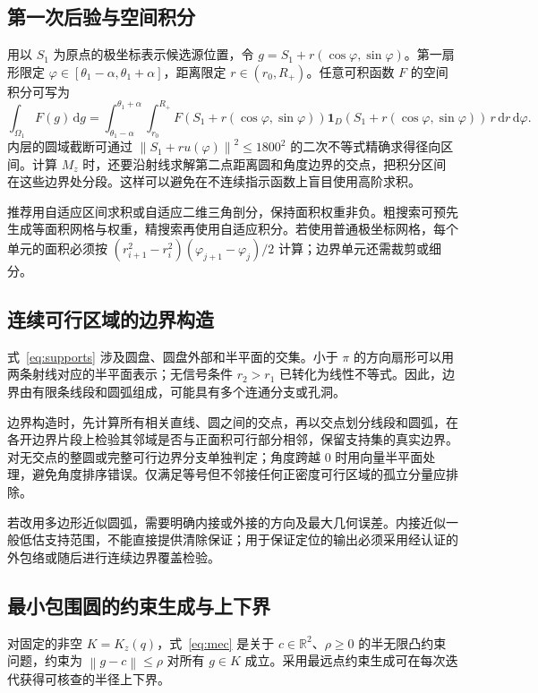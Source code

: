 \documentclass[UTF8,a4paper,zihao=-4,fontset=none]{ctexart}
\numberwithin{equation}{section}
\theoremstyle{definition}
\newcommand{\R}{\mathbb R}
\newcommand{\ind}{\mathbf 1}
\newcommand{\dd}{\,\mathrm d}
\newcommand{\norm}[1]{\left\lVert #1\right\rVert}
\begin{document}
\subsection{第一次后验与空间积分}
用以 \(S_1\) 为原点的极坐标表示候选源位置，令 \(g=S_1+r(\cos\varphi,\sin\varphi)\)。第一扇形限定 \(\varphi\in[\theta_1-\alpha,\theta_1+\alpha]\)，距离限定 \(r\in(r_0,R_+)\)。任意可积函数 \(F\) 的空间积分可写为
\begin{equation}\label{eq:polar}
\int_{\Omega_1}F(g)\dd g
=\int_{\theta_1-\alpha}^{\theta_1+\alpha}
\int_{r_0}^{R_+}
F\!\left(S_1+r(\cos\varphi,\sin\varphi)\right)
\ind_D\!\left(S_1+r(\cos\varphi,\sin\varphi)\right)
\,r\dd r\dd\varphi.
\end{equation}
内层的圆域截断可通过 \(\norm{S_1+ru(\varphi)}^2\le1800^2\) 的二次不等式精确求得径向区间。计算 \(M_z\) 时，还要沿射线求解第二点距离圆和角度边界的交点，把积分区间在这些边界处分段。这样可以避免在不连续指示函数上盲目使用高阶求积。

推荐用自适应区间求积或自适应二维三角剖分，保持面积权重非负。粗搜索可预先生成等面积网格与权重，精搜索再使用自适应积分。若使用普通极坐标网格，每个单元的面积必须按 \((r_{i+1}^2-r_i^2)(\varphi_{j+1}-\varphi_j)/2\) 计算；边界单元还需裁剪或细分。

\subsection{连续可行区域的边界构造}
式~\eqref{eq:supports} 涉及圆盘、圆盘外部和半平面的交集。小于 \(\pi\) 的方向扇形可以用两条射线对应的半平面表示；无信号条件 \(r_2>r_1\) 已转化为线性不等式。因此，边界由有限条线段和圆弧组成，可能具有多个连通分支或孔洞。

边界构造时，先计算所有相关直线、圆之间的交点，再以交点划分线段和圆弧，在各开边界片段上检验其邻域是否与正面积可行部分相邻，保留支持集的真实边界。对无交点的整圆或完整可行边界分支单独判定；角度跨越 \(0\) 时用向量半平面处理，避免角度排序错误。仅满足等号但不邻接任何正密度可行区域的孤立分量应排除。

若改用多边形近似圆弧，需要明确内接或外接的方向及最大几何误差。内接近似一般低估支持范围，不能直接提供清除保证；用于保证定位的输出必须采用经认证的外包络或随后进行连续边界覆盖检验。

\subsection{最小包围圆的约束生成与上下界}
对固定的非空 \(K=K_z(q)\)，式~\eqref{eq:mec} 是关于 \(c\in\R^2\)、\(\rho\ge0\) 的半无限凸约束问题，约束为 \(\norm{g-c}\le\rho\) 对所有 \(g\in K\) 成立。采用最远点约束生成可在每次迭代获得可核查的半径上下界。
\end{document}

